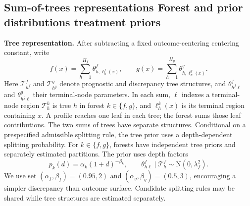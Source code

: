 \documentclass[11pt]{article}
\newcommand{\N}{\mathrm{N}}
\newcommand{\ind}{\mathbf{1}}
\theoremstyle{remark}\newtheorem{remark}{Remark}[section]
\providecommand{\DIFaddtex}[1]{{\protect\color{blue} \sf #1}} %
\providecommand{\DIFdeltex}[1]{{\protect\color{red} \scriptsize #1}} %
\providecommand{\DIFaddbegin}{} %
\providecommand{\DIFaddend}{} %
\providecommand{\DIFdelbegin}{} %
\providecommand{\DIFdelend}{} %
\providecommand{\DIFadd}[1]{\texorpdfstring{\DIFaddtex{#1}}{#1}} %
\providecommand{\DIFdel}[1]{\texorpdfstring{\DIFdeltex{#1}}{}} %
\begin{document}
\DIFaddend \subsection{\DIFdelbegin \DIFdel{Sum-of-trees representations }\DIFdelend \DIFaddbegin \DIFadd{Forest }\DIFaddend and \DIFdelbegin \DIFdel{prior distributions}\DIFdelend \DIFaddbegin \DIFadd{treatment priors}\DIFaddend }
\DIFdelbegin %
\DIFdel{\textbf{Tree representation.}
}\DIFdelend After subtracting a fixed \DIFdelbegin \DIFdel{outcome-centering }\DIFdelend \DIFaddbegin \DIFadd{centering }\DIFaddend constant, write
\DIFdelbegin %
\DIFdelend \DIFaddbegin \begin{equation}\label{eq:trees}
f(x)=\sum_{h=1}^{H_f}\theta^f_{h,\ell_h^f(x)},\qquad
g(x)=\sum_{h=1}^{H_g}\theta^g_{h,\ell_h^g(x)}.
\end{equation}\DIFaddend 
Here \DIFdelbegin \DIFdel{$\mathcal T_{h^f}^f$ and $\mathcal T_{h^g}^g$ denote prognostic and discrepancy tree structures, and $\theta^f_{h^f\ell}$ and $\theta^g_{h^g\ell}$ their terminal-node parameters. In each sum, $\ell$ indexes a terminal-node region}\DIFdelend \DIFaddbegin \DIFadd{$\mathcal T_h^k$ is tree $h$ in forest $k\in\{f,g\}$, and $\ell_h^k(x)$ is its terminal region containing $x$. A profile reaches one leaf in each tree; the forest sums those leaf contributions}\DIFaddend . The two \DIFdelbegin \DIFdel{sums of trees have separate structures. Conditional on a prespecified admissible splitting rule, the tree prior uses a depth-dependent splitting probability. For $k\in\{f,g\}$,
}%
\DIFdelend \DIFaddbegin \DIFadd{forests have independent tree priors and separately estimated partitions. The prior uses depth factors
}\begin{equation}\label{eq:treeprior}
p_k(d)=\alpha_k(1+d)^{-\beta_k},\qquad
\theta^f_{h\ell}\mid\mathcal T_h^f\sim\N(0,\lambda_f^2).
\end{equation}\DIFaddend 
We \DIFdelbegin \DIFdel{use }\DIFdelend \DIFaddbegin \DIFadd{set }\DIFaddend $(\alpha_f,\beta_f)=(0.95,2)$ and $(\alpha_g,\beta_g)=(0.5,3)$, encouraging a simpler discrepancy \DIFdelbegin \DIFdel{than outcome surface. Candidate splitting rules may be shared while tree structures are estimated separately.
}%
\end{document}
